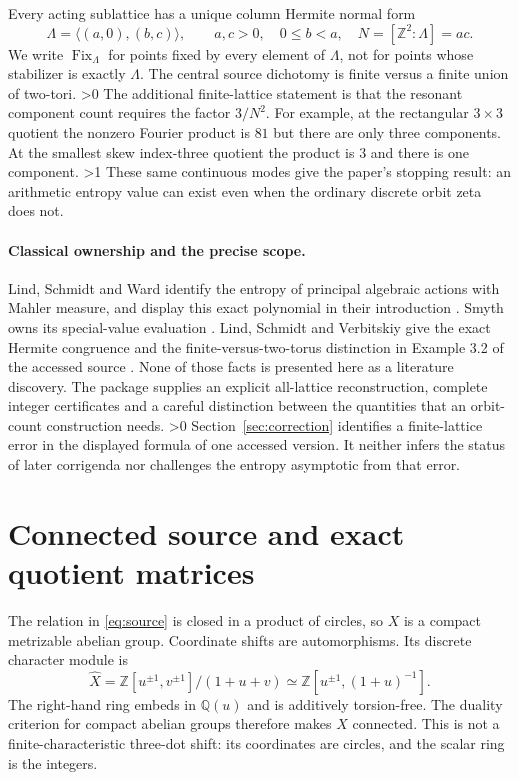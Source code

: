 \documentclass[10pt]{article}
\newcommand{\Z}{\mathbb Z}
\newcommand{\Fix}{\operatorname{Fix}}
\begin{document}
Every acting sublattice has a unique column Hermite normal form
\begin{equation}\label{eq:hnf}
 \Lambda=\langle(a,0),(b,c)\rangle,\qquad
 a,c>0,\quad0\le b<a,\quad N=[\Z^2:\Lambda]=ac.
\end{equation}
We write $\Fix_\Lambda$ for points fixed by every element of $\Lambda$,
not for points whose stabilizer is exactly $\Lambda$.
The central source dichotomy is finite versus a finite union of two-tori.
\ifnum\CRevisionRound>0
The additional finite-lattice statement is that the resonant component
count requires the factor $3/N^2$. For example, at the rectangular
$3\times3$ quotient the nonzero Fourier product is $81$ but there are only
three components. At the smallest skew index-three quotient the product
is $3$ and there is one component.
\fi
\ifnum\CRevisionRound>1
These same continuous modes give the paper's stopping result: an arithmetic
entropy value can exist even when the ordinary discrete orbit zeta does not.
\fi

\paragraph{Classical ownership and the precise scope.}
Lind, Schmidt and Ward identify the entropy of principal algebraic actions
with Mahler measure, and display this exact polynomial in their introduction
\cite{lsw}. Smyth owns its special-value evaluation \cite{smyth}.
Lind, Schmidt and Verbitskiy give the exact Hermite congruence and the
finite-versus-two-torus distinction in Example 3.2 of the accessed source
\cite{lsv}. None of those facts is presented here as a literature discovery.
The package supplies an explicit all-lattice reconstruction, complete
integer certificates and a careful distinction between the quantities
that an orbit-count construction needs.
\ifnum\CRevisionRound>0
Section~\ref{sec:correction} identifies a finite-lattice error in the
displayed formula of one accessed version. It neither infers the status
of later corrigenda nor challenges the entropy asymptotic from that error.
\fi

\section{Connected source and exact quotient matrices}
The relation in \eqref{eq:source} is closed in a product of circles, so $X$
is a compact metrizable abelian group. Coordinate shifts are automorphisms.
Its discrete character module is
\begin{equation}\label{eq:dual}
 \widehat X=\Z[u^{\pm1},v^{\pm1}]/(1+u+v)
 \simeq\Z[u^{\pm1},(1+u)^{-1}].
\end{equation}
The right-hand ring embeds in $\mathbb Q(u)$ and is additively torsion-free.
The duality criterion for compact abelian groups therefore makes $X$
connected. This is not a finite-characteristic three-dot shift: its
coordinates are circles, and the scalar ring is the integers.
\end{document}
